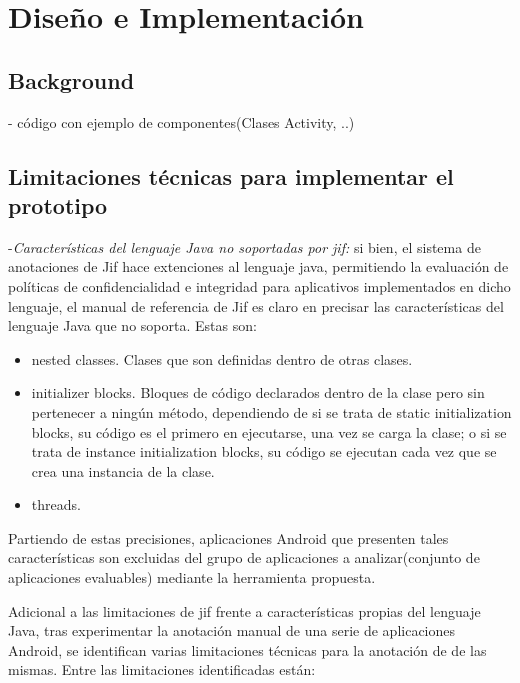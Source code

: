 \label{ch:desing}
\chapter{Diseño e Implementación}

\section{Background}
- código con ejemplo de componentes(Clases Activity, ..)

\section{Limitaciones técnicas para implementar el prototipo}
-\textit{Características del lenguaje Java no soportadas por jif:}\newline
si bien, el sistema de anotaciones de Jif hace extenciones al lenguaje java,
permitiendo la evaluación de políticas de confidencialidad e integridad para
aplicativos implementados en dicho lenguaje, el manual de referencia de Jif es
claro en precisar las características del lenguaje Java que no
soporta\cite{jifRef}.
Estas son:
\begin{itemize}
  \item nested classes. Clases que son definidas dentro de otras clases.
  \item initializer blocks. Bloques de código declarados dentro de la clase pero
  sin pertenecer a ningún método, dependiendo de si se trata de static
  initialization blocks, su código es el primero en ejecutarse, una vez se
  carga la clase; o si se trata de instance initialization blocks, su código se
  ejecutan cada vez que se crea una instancia de la clase.
\item threads.
\end{itemize} 
Partiendo de estas precisiones, aplicaciones Android que presenten tales
características son excluidas del grupo de aplicaciones a analizar(conjunto de
aplicaciones evaluables) mediante la herramienta propuesta.

Adicional a las limitaciones de jif frente a características propias del
lenguaje Java, tras experimentar la anotación manual de una serie de
aplicaciones Android, se identifican varias limitaciones técnicas para la
anotación de de las mismas. Entre las limitaciones identificadas están:\newline 

